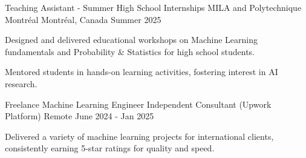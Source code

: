 

\begin{cventries}

    \cventry
    {Teaching Assistant - Summer High School Internships} %
    {MILA and Polytechnique Montréal} %
    {Montréal, Canada} %
    {Summer 2025} %
    {
      \begin{cvitems} %
        \item {Designed and delivered educational workshops on Machine Learning fundamentals and Probability \& Statistics for high school students.}
        \item {Mentored students in hands-on learning activities, fostering interest in AI research.}
      \end{cvitems}
    }
    
    \cventry
    {Freelance Machine Learning Engineer} %
    {Independent Consultant (Upwork Platform)} %
    {Remote} %
    {June 2024 - Jan 2025} %
    {
      \begin{cvitems} %
        \item {Delivered a variety of machine learning projects for international clients, consistently earning 5-star ratings for quality and speed.}
      \end{cvitems}
    }


\end{cventries}

